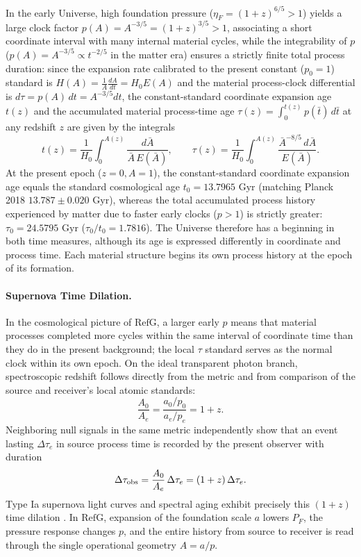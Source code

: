 \documentclass[11pt,a4paper]{article}
\newcommand{\RefG}{\mathrm{RefG}}
\begin{document}
In the early Universe, high foundation pressure ($\eta_F = (1+z)^{6/5} > 1$) yields a large clock factor $p(A) = A^{-3/5} = (1+z)^{3/5} > 1$, associating a short coordinate interval with many internal material cycles, while the integrability of $p$ ($p(A) = A^{-3/5} \propto t^{-2/5}$ in the matter era) ensures a strictly finite total process duration: since the expansion rate calibrated to the present constant ($p_0 = 1$) standard is $H(A) = \frac{1}{A}\frac{dA}{dt} = H_0 E(A)$ and the material process-clock differential is $d\tau = p(A)\,dt = A^{-3/5}dt$, the constant-standard coordinate expansion age $t(z)$ and the accumulated material process-time age $\tau(z) = \int_0^{t(z)} p(\bar{t})\,d\bar{t}$ at any redshift $z$ are given by the integrals
\begin{equation}
t(z) = \frac{1}{H_0}\int_0^{A(z)} \frac{d\bar{A}}{\bar{A}\,E(\bar{A})},
\qquad
\tau(z) = \frac{1}{H_0}\int_0^{A(z)} \frac{\bar{A}^{-8/5}\,d\bar{A}}{E(\bar{A})}.
\end{equation}
At the present epoch ($z = 0, A = 1$), the constant-standard coordinate expansion age equals the standard cosmological age \textbf{$t_0 = 13.7965\text{ Gyr}$} (matching Planck 2018 $13.787 \pm 0.020\text{ Gyr}$), whereas the total accumulated process history experienced by matter due to faster early clocks ($p > 1$) is strictly greater: \textbf{$\tau_0 = 24.5795\text{ Gyr}$} ($\tau_0 / t_0 = 1.7816$). The Universe therefore has a beginning in both time measures, although its age is expressed differently in coordinate and process time. Each material structure begins its own process history at the epoch of its formation.

\paragraph{Supernova Time Dilation.}

In the cosmological picture of $\RefG$, a larger early $p$ means that material processes completed more cycles within the same interval of coordinate time than they do in the present background; the local $\tau$ standard serves as the normal clock within its own epoch. On the ideal transparent photon branch, spectroscopic redshift follows directly from the metric and from comparison of the source and receiver's local atomic standards:
\begin{equation}
\frac{A_0}{A_e}
=
\frac{a_0/p_0}{a_e/p_e}
=
1+z.
\end{equation}
Neighboring null signals in the same metric independently show that an event lasting $\Delta\tau_e$ in source process time is recorded by the present observer with duration
\begin{equation}
\Delta\tau_{\rm obs}
=
\frac{A_0}{A_e}\,\Delta\tau_e
=
(1+z)\,\Delta\tau_e.
\end{equation}
Type Ia supernova light curves and spectral aging exhibit precisely this $(1+z)$ time dilation \citep{blondin2008}. In $\RefG$, expansion of the foundation scale $a$ lowers $P_F$, the pressure response changes $p$, and the entire history from source to receiver is read through the single operational geometry $A=a/p$.
\end{document}
